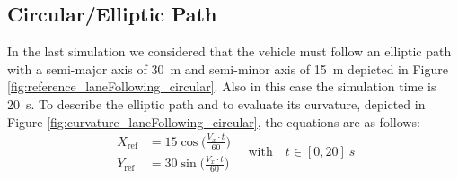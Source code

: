 \subsection{Circular/Elliptic Path}
In the last simulation we considered that the vehicle must follow an elliptic path with a semi-major axis of \SI{30}{m} and semi-minor axis of \SI{15}{m} depicted in Figure \ref{fig:reference_laneFollowing_circular}. Also in this case the simulation time is \SI{20}{s}.
To describe the elliptic path and to evaluate its curvature, depicted in Figure \ref{fig:curvature_laneFollowing_circular}, the equations are as follows:
\begin{equation}
	\begin{aligned}
	X_\text{ref}&=\displaystyle 15\cos\Bigg(\frac{V_x\cdot t}{60}\Bigg)\\
	Y_\text{ref}&=\displaystyle 30\sin\Bigg(\frac{V_x\cdot t}{60}\Bigg)  
	\end{aligned} \quad\text{with}\quad t\in[0,20]\SI{}{s}
\end{equation}
